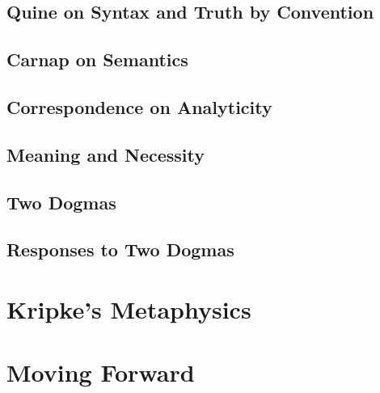 \section{Quine on Syntax and Truth by Convention}

\section{Carnap on Semantics}

\section{Correspondence on Analyticity}

\section{Meaning and Necessity}

\section{Two Dogmas}

\section{Responses to Two Dogmas}

\chapter{Kripke's Metaphysics}

\chapter{Moving Forward}

\backmatter




\clearpage

\clearpage

\twocolumn[
]
{\small\printindex}

\vfil


